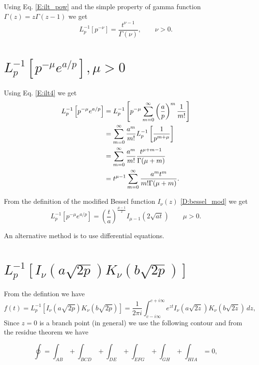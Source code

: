 Using Eq. \ref{E:ilt_pow} and the simple property of gamma function
$\Gamma(z)=z\Gamma(z-1)$ we get
\begin{equation} \label{E:ilt4}
  L_p^{-1} \left[ p^{-\nu} \right] 
    = \frac{t^{\nu-1}}{\Gamma(\nu)}, \qquad \nu>0.
\end{equation}

\section{$L_p^{-1}[ p^{-\mu} e^{a/p} ], \mu>0 $ }
Using Eq. \ref{E:ilt4} we get 
\begin{align*}
  L_p^{-1} \left[ p^{-\mu} e^{a/p} \right]
    &= L_p^{-1} 
       \left[ p^{-\mu} 
         \sum_{m=0}^{\infty} \left( \frac{a}{p} \right)^m \frac{1}{m!}
       \right]  \notag \\
    &= \sum_{m=0}^{\infty} \frac{a^m}{m!}
       L_p^{-1} \left[ \frac{1}{p^{m+\mu}} \right]  \notag \\
    &= \sum_{m=0}^{\infty} \frac{a^m}{m!}
       \frac{t^{\mu+m-1}}{\Gamma(\mu+m)}      \notag \\
    &= t^{\mu-1} \sum_{m=0}^{\infty} \frac{a^m t^m}{m!\Gamma(\mu+m)}. \notag\\
\end{align*}

From the definition of the modified Bessel function $I_{\nu}(z)$
\ref{D:bessel_mod}
we get
\begin{equation} \label{E:ilt5}
  L_p^{-1} \left[ p^{-\mu} e^{a/p} \right]
    = \left( \frac{t}{a} \right)^{\frac{\mu-1}{2}} I_{\mu-1}(2\sqrt{at})
      \qquad \mu>0.   
\end{equation}

An alternative method is to use differential equations.


\section{$L_p^{-1}[ I_{\nu}(a\sqrt{2p}) K_{\nu}(b\sqrt{2p}) ]$ }
From the defintion we have
\[
  f(t)=L_p^{-1} \left[ I_{\nu}(a\sqrt{2p}) K_{\nu}(b\sqrt{2p}) \right]
   = \frac{1}{2\pi i}  \int_{c-i\infty}^{c+i\infty}
     e^{zt} I_{\nu}(a\sqrt{2z}) K_{\nu}(b\sqrt{2z})\, dz,
\]
Since $z=0$ is a branch point (in general) we use the following contour and 
from the residue theorem we have

\[
  \oint = \int_{AB} + \int_{BCD} + \int_{DE} + \int_{EFG} + \int_{GH}
          + \int_{HIA} = 0,
\]

